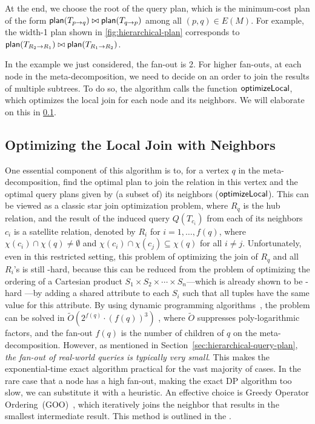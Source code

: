 At the end, we choose the root of the query plan, which is the minimum-cost plan of the form ${\sf plan}(T_{p \to q}) \bowtie {\sf plan}(T_{q \to p})$ among all $(p, q) \in E(M)$. For example, the width-1 plan shown in \cref{fig:hierarchical-plan} corresponds to ${\sf plan}(T_{R_2 \to R_1}) \bowtie {\sf plan}(T_{R_1 \to R_2})$.

In the example we just considered, the fan-out is 2. For higher fan-outs, at each node in the meta-decomposition, we need to decide on an order to join the results of multiple subtrees. To do so, the algorithm calls the function $\sf optimizeLocal $, which optimizes the local join for each node and its neighbors. We will elaborate on this in \cref{sec:local-join}. 




\subsection{Optimizing the Local Join with Neighbors}
\label{sec:local-join}
One essential component of this algorithm is to, for a vertex $q$ in the meta-decomposition, find the optimal plan to join the relation in this vertex and the optimal query plans given by (a subset of) its neighbors ($\sf optimizeLocal$).  This can be viewed as a classic star join optimization problem, where $R_q$ is the hub relation, and the result of the induced query $Q(T_{c_i})$ from each of its neighbors $c_i$ is a satellite relation, denoted by $R_{i}$ for $i = 1, \dots, f(q)$, where $\chi(c_i) \cap \chi(q) \neq \emptyset$ and $\chi(c_i) \cap \chi(c_j) \subseteq \chi(q)$ for all $i \neq j$.
Unfortunately, even in this restricted setting, this problem of optimizing the join of $R_q$ and all $R_i$'s is still \NP{}-hard, because this can be reduced from the problem of optimizing the ordering of a Cartesian product $S_1 \times S_2 \times \cdots \times S_n$---which is already shown to be \NP{}-hard \cite{scheufele_constructing_1996}---by adding a shared attribute to each $S_i$ such that all tuples have the same value for this attribute.  By using dynamic programming algorithms~\cite{moerkotte_dynamic_2008,stoian_dpconv_2024}, the problem can be solved in $\widetilde{O}(2^{f(q)} \cdot (f(q))^3)$
, where $\widetilde{O}$ suppresses poly-logarithmic factors, and the fan-out $f(q)$ is the number of children of $q$ on the meta-decomposition.  However, as mentioned in Section~\ref{sec:hierarchical-query-plan}, \emph{the fan-out of real-world queries is typically very small}. This makes the exponential-time exact algorithm practical for the vast majority of cases. 
In the rare case that a node has a high fan-out, making the exact DP algorithm too slow, we can substitute it with a heuristic. An effective choice is Greedy Operator Ordering~(GOO)~\cite{fegaras_new_1998}, which iteratively joins the neighbor that results in the smallest intermediate result. This method is outlined in the \arxivorappendix.

